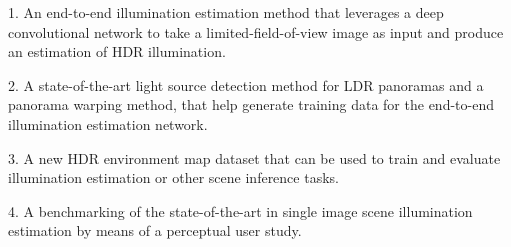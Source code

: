 1. An end-to-end illumination estimation method that leverages a deep convolutional network to take a limited-field-of-view image as input and produce an estimation of HDR illumination.

2. A state-of-the-art light source detection method for LDR panoramas and a panorama warping method, that help generate training data for the end-to-end illumination estimation network.

3. A new HDR environment map dataset that can be used to train and evaluate illumination estimation or other scene inference tasks.

4. A benchmarking of the state-of-the-art in single image scene illumination estimation by means of a perceptual user study.











